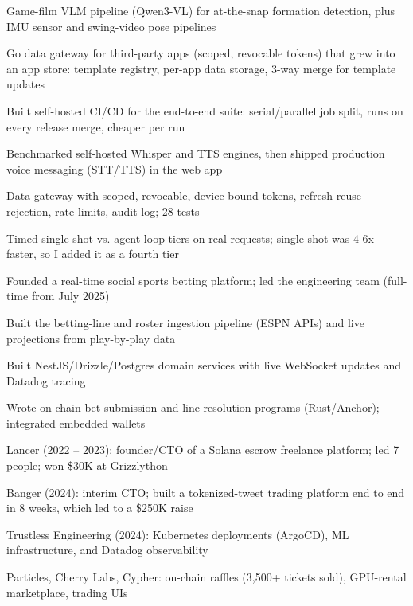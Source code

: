 \documentclass[print]{jack-resume}
\begin{document}
\begin{tightemize}
    \item Game-film VLM pipeline (Qwen3-VL) for at-the-snap formation detection, plus IMU sensor and swing-video pose pipelines
    \item Go data gateway for third-party apps (scoped, revocable tokens) that grew into an app store: template registry, per-app data storage, 3-way merge for template updates
    \item Built self-hosted CI/CD for the end-to-end suite: serial/parallel job split, runs on every release merge, cheaper per run
    \item Benchmarked self-hosted Whisper and TTS engines, then shipped production voice messaging (STT/TTS) in the web app
    \item Data gateway with scoped, revocable, device-bound tokens, refresh-reuse rejection, rate limits, audit log; 28 tests
    \item Timed single-shot vs. agent-loop tiers on real requests; single-shot was 4-6x faster, so I added it as a fourth tier
\end{tightemize}
\sectionsep

\begin{tightemize}
    \item Founded a real-time social sports betting platform; led the engineering team (full-time from July 2025)
    \item Built the betting-line and roster ingestion pipeline (ESPN APIs) and live projections from play-by-play data
    \item Built NestJS/Drizzle/Postgres domain services with live WebSocket updates and Datadog tracing
    \item Wrote on-chain bet-submission and line-resolution programs (Rust/Anchor); integrated embedded wallets
\end{tightemize}
\sectionsep

\begin{tightemize}
    \item Lancer (2022 – 2023): founder/CTO of a Solana escrow freelance platform; led 7 people; won \$30K at Grizzlython
    \item Banger (2024): interim CTO; built a tokenized-tweet trading platform end to end in 8 weeks, which led to a \$250K raise
    \item Trustless Engineering (2024): Kubernetes deployments (ArgoCD), ML infrastructure, and Datadog observability
    \item Particles, Cherry Labs, Cypher: on-chain raffles (3,500+ tickets sold), GPU-rental marketplace, trading UIs
\end{tightemize}
\sectionsep
\end{document}
